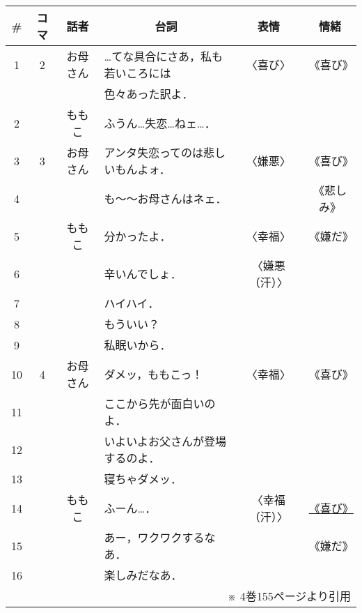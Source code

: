 \documentclass[japanese]{jnlp_1.3c}
\begin{document}
\vspace{\baselineskip}
\begin{center}
\begin{tabular}{|c|c|c|l|c|c|}
\hline
\# & コマ & 話者 & \multicolumn{1}{|c|}{台詞} & 表情 & 情緒 \\
\hline
1  & 2 &お母さん&…てな具合にさあ，私も若いころには&〈喜び〉      &《喜び》\\
   &   &        &色々あった訳よ．                  &              & \\
\cline{1-1} \cline{3-6}
2  &   &ももこ  &ふうん…失恋…ねェ…．            &              & \\
\hline
3  & 3 &お母さん&アンタ失恋ってのは悲しいもんよォ．&〈嫌悪〉      &《喜び》\\
\cline{1-1} \cline{4-4}
4  &   &        &も〜〜お母さんはネェ．            &              &《悲しみ》\\
\cline{1-1} \cline{3-6}
5  &   &ももこ  &分かったよ．                      &〈幸福〉      &《嫌だ》\\
\cline{1-1} \cline{4-4}
6  &   &        &辛いんでしょ．                    &〈嫌悪（汗）〉& \\
\cline{1-1} \cline{4-4}
7  &   &        &ハイハイ．                        &              & \\
\cline{1-1} \cline{4-4}
8  &   &        &もういい？                        &              & \\
\cline{1-1} \cline{4-4}
9  &   &        &私眠いから．                      &              & \\
\hline
10 & 4 &お母さん&ダメッ，ももこっ！                &〈幸福〉      &《喜び》\\
\cline{1-1} \cline{4-4}
11 &   &        &ここから先が面白いのよ．          &              & \\
\cline{1-1} \cline{4-4}
12 &   &        &いよいよお父さんが登場するのよ．  &              & \\
\cline{1-1} \cline{4-4}
13 &   &        &寝ちゃダメッ．                    &              & \\
\cline{1-1} \cline{3-6}
14 &   &ももこ  &ふーん…．                        &〈幸福（汗）〉&\underline{《喜び》}\\
\cline{1-1} \cline{4-4}
15 &   &        &あー，ワクワクするなあ．          &              &《嫌だ》\\
\cline{1-1} \cline{4-4}
16 &   &        &楽しみだなあ．                    &              & \\
\hline
\multicolumn{6}{r}{※ 4巻155ページより引用}
\end{tabular}
\end{center}
\end{document}
